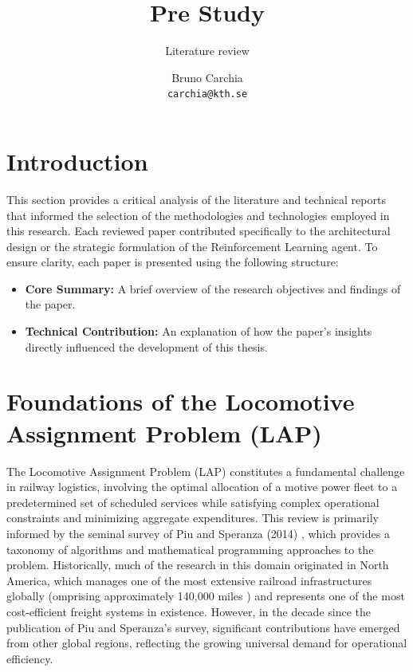 \documentclass[a4paper]{scrartcl}
\title{Pre Study}
\subtitle{Literature review}
\author{
Bruno Carchia \\
\texttt{carchia@kth.se}
}
\begin{document}
\maketitle
\section*{Introduction}
This section provides a critical analysis of the literature and technical reports that informed the selection of the methodologies and technologies employed in this research. Each reviewed paper contributed specifically to the architectural design or the strategic formulation of the Reinforcement Learning agent. To ensure clarity, each paper is presented using the following structure:

\begin{itemize}
    \item \textbf{Core Summary:} A brief overview of the research objectives and findings of the paper.
    \item \textbf{Technical Contribution:} An explanation of how the paper's insights directly influenced the development of this thesis.
\end{itemize}
\section{Foundations of the Locomotive Assignment Problem (LAP)}

The Locomotive Assignment Problem (LAP) constitutes a fundamental challenge in railway logistics, involving the optimal allocation of a motive power fleet to a predetermined set of scheduled services while satisfying complex operational constraints and minimizing aggregate expenditures. This review is primarily informed by the seminal survey of Piu and Speranza (2014) \cite{Piuetal2014}, which provides a taxonomy of algorithms and mathematical programming approaches to the problem. Historically, much of the research in this domain originated in North America, which manages one of the most extensive railroad infrastructures globally (omprising approximately 140,000 miles ) and represents one of the most cost-efficient freight systems in existence. However, in the decade since the publication of Piu and Speranza's survey, significant contributions have emerged from other global regions, reflecting the growing universal demand for operational efficiency.
\end{document}
